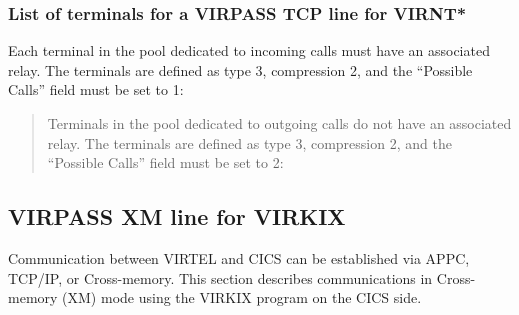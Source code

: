 \documentclass[letterpaper,10pt,english]{sphinxmanual}
\begin{document}
\subsubsection{List of terminals for a VIRPASS TCP line for VIRNT*}
\label{\detokenize{connectivity_guide:list-of-terminals-for-a-virpass-tcp-line-for-virnt}}
Each terminal in the pool dedicated to incoming calls must have an associated relay. The terminals are defined as type 3, compression 2, and the “Possible Calls” field must be set to 1:

\begin{quote}

Terminals in the pool dedicated to outgoing calls do not have an associated relay. The terminals are defined as type 3, compression 2, and the “Possible Calls” field must be set to 2:
\end{quote}



\subsection{VIRPASS XM line for VIRKIX}
\label{\detokenize{connectivity_guide:virpass-xm-line-for-virkix}}
Communication between VIRTEL and CICS can be established via APPC, TCP/IP, or Cross-memory. This section describes communications in Cross-memory (XM) mode using the VIRKIX program on the CICS side.

\end{document}
